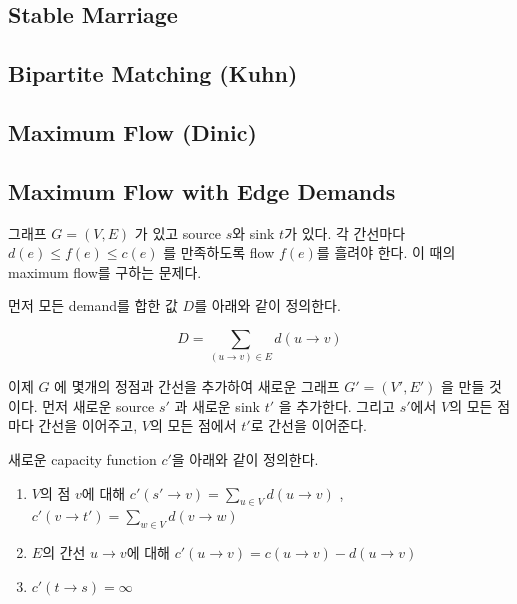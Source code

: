 \documentclass[9pt,landscape,a4paper,twocolumn]{extarticle}
\begin{document}
\subsection{Stable Marriage}


\subsection{Bipartite Matching (Kuhn)}


% 

\subsection{Maximum Flow (Dinic)}


\subsection{Maximum Flow with Edge Demands}

그래프 $G=(V,E)$ 가 있고 source $s$와 sink $t$가 있다. 각 간선마다 $d(e) \leq f(e) \leq c(e)$ 를 만족하도록 flow $f(e)$를 흘려야 한다. 이 때의 maximum flow를 구하는 문제다.

먼저 모든 demand를 합한 값 $D$를 아래와 같이 정의한다.

\begin{displaymath}
D = \sum_{(u \to v) \in E} d(u \to v)
\end{displaymath}

이제 $G$ 에 몇개의 정점과 간선을 추가하여 새로운 그래프 $G'=(V',E')$ 을 만들 것이다. 먼저 새로운 source $s'$ 과 새로운 sink $t'$ 을 추가한다. 그리고 $s'$에서 $V$의 모든 점마다 간선을 이어주고, $V$의 모든 점에서 $t'$로 간선을 이어준다.

새로운 capacity function $c'$을 아래와 같이 정의한다.

\begin{enumerate}
\item $V$의 점 $v$에 대해 $c'(s' \to v) = \sum_{u \in V} d(u \to v)$ , $c'(v \to t') = \sum_{w \in V} d(v \to w)$
\item $E$의 간선 $u \to v$에 대해 $c'(u \to v) = c(u \to v) - d(u \to v)$
\item $c'(t \to s) = \infty$
\end{enumerate}
\end{document}
